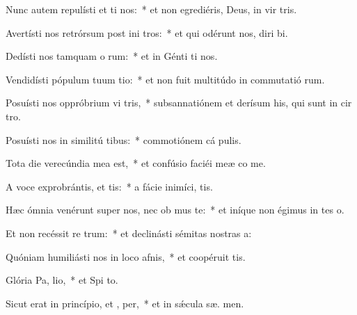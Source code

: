 \item Nunc autem repulísti et ti nos:~* et non egrediéris, Deus, in vir tris.
\item Avertísti nos retrórsum post ini tros:~* et qui odérunt nos, diri bi.
\item Dedísti nos tamquam o rum:~* et in Génti ti nos.
\item Vendidísti pópulum tuum  tio:~* et non fuit multitúdo in commutatió rum.
\item Posuísti nos oppróbrium vi tris,~* subsannatiónem et derísum his, qui sunt in cir tro.
\item Posuísti nos in similitú tibus:~* commotiónem cá  pulis.
\item Tota die verecúndia mea   est,~* et confúsio faciéi meæ co me.
\item A voce exprobrántis, et tis:~* a fácie inimíci,  tis.
\item Hæc ómnia venérunt super nos, nec ob mus te:~* et iníque non égimus in tes o.
\item Et non recéssit re  trum:~* et declinásti sémitas nostras   a:
\item Quóniam humiliásti nos in loco afnis,~* et coopéruit   tis.
\item Glória Pa,  lio,~* et Spi to.
\item Sicut erat in princípio, et ,  per,~* et in sǽcula sæ. men.
